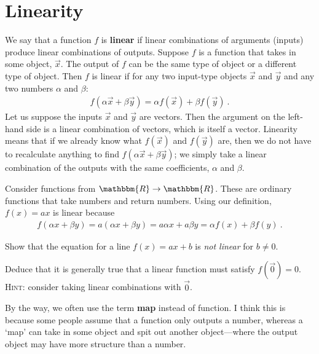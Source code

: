 \documentclass[12pt, oneside]{report}    %
\let\oldsection\section
\def\section{%
  \setcounter{sidenote}{1}%
  \oldsection
}
\begin{document}
\section{Linearity}

\begin{bigidea}[Linearity] We say that a function $f$ is \textbf{linear} if linear combinations of arguments (inputs) produce linear combinations of outputs. Suppose $f$ is a function that takes in some object, $\vec{x}$. The output of $f$ can be the same type of object or a different type of object. Then $f$ is linear if for any two input-type objects $\vec{x}$ and $\vec{y}$ and any two numbers $\alpha$ and $\beta$:
\begin{align}
    f(\alpha\vec{x}+ \beta\vec{y}) = \alpha f(\vec{x}) + \beta f(\vec{y}) \ .
    \label{eq:linear:function}
\end{align}
Let us suppose the inputs $\vec{x}$ and $\vec{y}$ are vectors. Then the argument on the left-hand side is a linear combination of vectors, which is itself a vector. Linearity means that if we already know what $f(\vec{x})$ and $f(\vec{y})$ are, then we do not have to recalculate anything to find $f(\alpha\vec{x}+\beta\vec{y})$; we simply take a linear combination of the outputs with the same coefficients, $\alpha$ and $\beta$.
\end{bigidea}

\begin{example}
Consider functions from $\mathbbm{R}\to\mathbbm{R}$. These are ordinary functions that take numbers and return numbers. Using our definition, $f(x) = ax$ is linear because
\begin{align}
    f(\alpha x+\beta y) = a(\alpha x + \beta y)  = a\alpha x + a \beta y =\alpha f(x) + \beta f(y) \ .
\end{align}
\end{example}

\begin{exercise}
Show that the equation for a line $f(x) = ax + b$ is \emph{not linear} for $b\neq 0$.\sidenotemark

Deduce that it is generally true that a linear function must satisfy $f(\vec{0}) = 0$. \textsc{Hint}: consider taking linear combinations with $\vec{0}$.
\end{exercise}

By the way, we often use the term \textbf{map} instead of function. I think this is because some people assume that a function only outputs a number, whereas a `map' can take in some object and spit out another object---where the output object may have more structure than a number.
\end{document}
